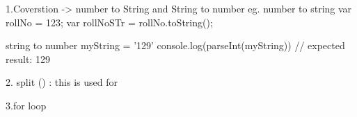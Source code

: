 1.Coverstion -> number to String and String to number
            eg. 
             number to string
            var rollNo = 123;
                var rollNoSTr = rollNo.toString();

            string to number
            myString = '129' 
            console.log(parseInt(myString)) // expected result: 129
       

2. split () :
                this is used for 

3.for loop
